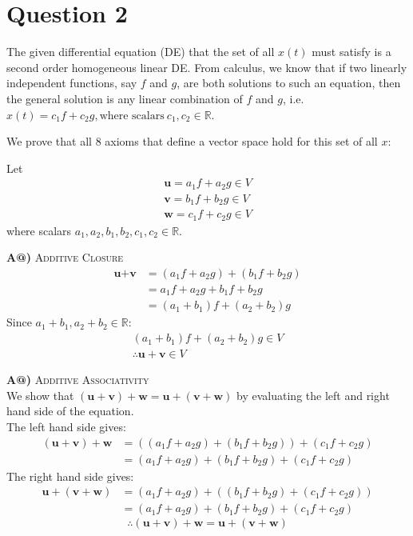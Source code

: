 \documentclass[10pt, letterpaper]{article}
\makeatletter
\newcommand*{\rom}[1]{\expandafter\@slowromancap\romannumeral #1@}
\makeatother
\begin{document}


\section{Question 2}

The given differential equation (DE) that the set of all $x(t)$ must satisfy is a second order homogeneous linear DE. 
From calculus, we know that if two linearly independent functions, say $f$ and $g$, are both 
solutions to such an equation, then the general solution is any linear 
combination of $f$ and $g$, i.e. $x(t) = c_1f + c_2g, \text{where scalars} \ c_1, c_2 \in \mathbb{R} $.

We prove that all 8 axioms that define a vector space hold for this set of all $x$:

Let
\begin{gather*}
    \textbf{u} = a_1f + a_2g \in V \\
    \textbf{v} = b_1f + b_2g \in V \\
    \textbf{w} = c_1f + c_2g \in V
\end{gather*}
where scalars $a_1, a_2, b_1, b_2, c_1, c_2 \in \mathbb{R}$.

\textbf{A\rom{1})} \textsc{Additive Closure}
\begin{align*}
    \textbf{u} + \textbf{v} &= (a_1f + a_2g) + (b_1f + b_2g) \\
    &= a_1f + a_2g + b_1f + b_2g \\
    &= (a_1 + b_1)f + (a_2 + b_2)g 
\end{align*}
Since $a_1 + b_1, a_2 + b_2 \in \mathbb{R}$:
\begin{gather*}
    (a_1 + b_1)f + (a_2 + b_2)g \in V \\
    \therefore \textbf{u} + \textbf{v} \in V
\end{gather*}

\textbf{A\rom{2})} \textsc{Additive Associativity} \\
We show that $ ( \textbf{u} + \textbf{v} ) + \textbf{w} = \textbf{u} + (\textbf{v} + \textbf{w})$
by evaluating the left and right hand side of the equation.\\
The left hand side gives:
\begin{align*}
    ( \textbf{u} + \textbf{v} ) + \textbf{w} &= ((a_1f + a_2g) + (b_1f + b_2g)) + (c_1f + c_2g) \\
    &= (a_1f + a_2g) + (b_1f + b_2g) + (c_1f + c_2g)
\end{align*}
The right hand side gives:
\begin{align*}
    \textbf{u} + (\textbf{v} + \textbf{w}) &= (a_1f + a_2g) + ((b_1f + b_2g) + (c_1f + c_2g)) \\
    &= (a_1f + a_2g) + (b_1f + b_2g) + (c_1f + c_2g)
\end{align*}
\begin{displaymath}
    \therefore ( \textbf{u} + \textbf{v} ) + \textbf{w} = \textbf{u} + (\textbf{v} + \textbf{w})
\end{displaymath}
\end{document}
